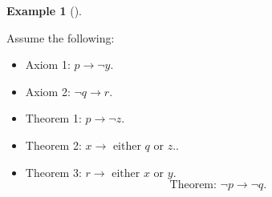 \documentclass[
  letterpaper,
  10pt,
  reqno,
  twopage,
  openany]{book}
\providecommand{\tightlist}{%
  \setlength{\itemsep}{0pt}\setlength{\parskip}{0pt}}\usepackage{longtable,booktabs,array}
\theoremstyle{plain}
\theoremstyle{definition}
\theoremstyle{definition}
\theoremstyle{definition}
\newtheorem{example}{Example}[chapter]
\theoremstyle{plain}
\theoremstyle{plain}
\theoremstyle{remark}
\begin{document}
\leavevmode{}%
\begin{example}[]\label{exm-proof-by-contrapositive}

Assume the following:

\begin{itemize}
\tightlist
\item
  Axiom 1: \(p\rightarrow \neg y\).
\item
  Axiom 2: \(\neg q\rightarrow r\).
\item
  Theorem 1: \(p\rightarrow \neg z\).
\item
  Theorem 2: \(x\rightarrow \text{ either } q \text{ or } z.\).
\item
  Theorem 3: \(r\rightarrow \text{ either } x \text{ or } y\). \[
  \text{Theorem: $\neg p\rightarrow \neg q.$}
  \]
\end{itemize}

\end{example}
\end{document}
